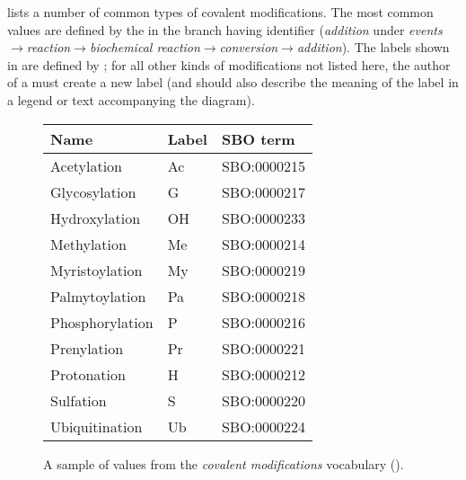  lists a number of common types of covalent modifications.  The most common values are defined by the \sbo in the branch having identifier  (\emph{addition} under \emph{events}$\rightarrow$\emph{reaction}$\rightarrow$\emph{biochemical reaction}$\rightarrow$\emph{conversion}$\rightarrow$\emph{addition}).  The labels shown in  are defined by \SBGNERLone; for all other kinds of modifications not listed here, the author of a \PD must create a new label (and should also describe the meaning of the label in a legend or text accompanying the diagram).

\begin{figure}[h]
  \centering
  \begin{tabular}{l>{\ttfamily}ll}
    \toprule
    \textbf{Name}   & \textbf{\rmfamily Label} & \textbf{SBO term} \\
    \midrule
    Acetylation     & Ac    & SBO:0000215\\
    Glycosylation   & G     & SBO:0000217\\
    Hydroxylation   & OH    & SBO:0000233\\
    Methylation     & Me    & SBO:0000214\\
    Myristoylation  & My    & SBO:0000219\\
    Palmytoylation  & Pa    & SBO:0000218\\
    Phosphorylation & P     & SBO:0000216\\
    Prenylation     & Pr    & SBO:0000221\\
    Protonation     & H     & SBO:0000212\\
    Sulfation       & S     & SBO:0000220\\
    Ubiquitination  & Ub    & SBO:0000224\\
    \bottomrule
  \end{tabular}
  \caption{A sample of values from the \emph{covalent modifications} vocabulary
    ().}
  \label{fig:covalent-mod-cv}
\end{figure}
 \normalcolor

